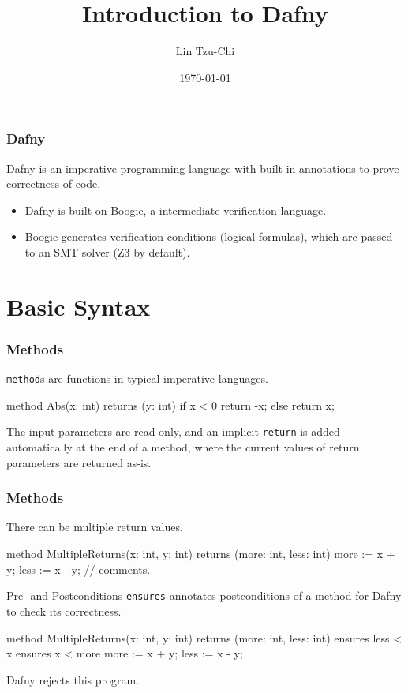 \documentclass[10pt, compress]{beamer}
\title{Introduction to Dafny}
\subtitle{}
\date{\today}
\author{Lin Tzu-Chi}
\begin{document}
\maketitle

\begin{frame}[fragile]
  \frametitle{Dafny}

  Dafny is an imperative programming language with built-in annotations to prove correctness of code.
  \begin{itemize}
  \item Dafny is built on Boogie, a intermediate verification language.
  \item Boogie generates verification conditions (logical formulas), which are passed to an SMT solver (Z3 by default).
  \end{itemize}
  
\end{frame}

\section{Basic Syntax}

\begin{frame}[fragile]
  \frametitle{Methods}
  
  \verb|method|s are functions in typical imperative languages.
  
  \begin{verbnobox}[\footnotesize]
method Abs(x: int) returns (y: int)
{
   if x < 0
     { return -x; }
   else
     { return x; }
}
  \end{verbnobox}
  The input parameters are read only, and an implicit \verb|return| is added automatically at the end of a method, where the current values of return parameters are returned as-is.
\end{frame}

\begin{frame}[fragile]
  \frametitle{Methods}
  
  There can be multiple return values.
  \begin{verbnobox}[\footnotesize]
method MultipleReturns(x: int, y: int)
returns (more: int, less: int)
{
   more := x + y;
   less := x - y;
   // comments.
}
  \end{verbnobox}
\end{frame}

\begin{frame}[fragile]{Pre- and Postconditions}
  \verb|ensures| annotates postconditions of a method for Dafny to check its correctness. 
  \begin{verbnobox}[\footnotesize]
method MultipleReturns(x: int, y: int)
returns (more: int, less: int)
   ensures less < x
   ensures x < more
{
   more := x + y;
   less := x - y;
}
  \end{verbnobox}	
  
Dafny rejects this program.
\end{frame}
\end{document}
